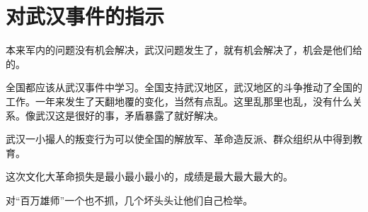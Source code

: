 \section[对武汉事件的指示（一九六七年七月）]{对武汉事件的指示}


本来军内的问题没有机会解决，武汉问题发生了，就有机会解决了，机会是他们给的。


全国都应该从武汉事件中学习。全国支持武汉地区，武汉地区的斗争推动了全国的工作。一年来发生了天翻地覆的变化，当然有点乱。这里乱那里也乱，没有什么关系。像武汉这是很好的事，矛盾暴露了就好解决。

武汉一小撮人的叛变行为可以使全国的解放军、革命造反派、群众组织从中得到教育。

这次文化大革命损失是最小最小最小的，成绩是最大最大最大的。


对“百万雄师”一个也不抓，几个坏头头让他们自己检举。

